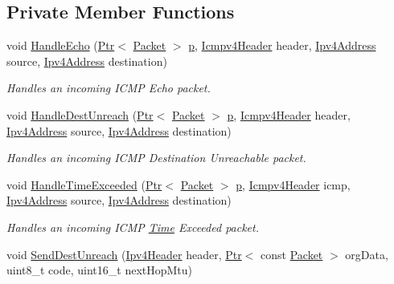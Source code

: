 \subsection*{Private Member Functions}
\begin{DoxyCompactItemize}
\item 
void \hyperlink{classns3_1_1Icmpv4L4Protocol_aaa610991d0cf4c045f1183c2e5042900}{Handle\+Echo} (\hyperlink{classns3_1_1Ptr}{Ptr}$<$ \hyperlink{classns3_1_1Packet}{Packet} $>$ \hyperlink{lte__link__budget__x2__handover__measures_8m_ac9de518908a968428863f829398a4e62}{p}, \hyperlink{classns3_1_1Icmpv4Header}{Icmpv4\+Header} header, \hyperlink{classns3_1_1Ipv4Address}{Ipv4\+Address} source, \hyperlink{classns3_1_1Ipv4Address}{Ipv4\+Address} destination)
\begin{DoxyCompactList}\small\item\em Handles an incoming I\+C\+MP Echo packet. \end{DoxyCompactList}\item 
void \hyperlink{classns3_1_1Icmpv4L4Protocol_aeed200f118290a87d0cb24ac1532f105}{Handle\+Dest\+Unreach} (\hyperlink{classns3_1_1Ptr}{Ptr}$<$ \hyperlink{classns3_1_1Packet}{Packet} $>$ \hyperlink{lte__link__budget__x2__handover__measures_8m_ac9de518908a968428863f829398a4e62}{p}, \hyperlink{classns3_1_1Icmpv4Header}{Icmpv4\+Header} header, \hyperlink{classns3_1_1Ipv4Address}{Ipv4\+Address} source, \hyperlink{classns3_1_1Ipv4Address}{Ipv4\+Address} destination)
\begin{DoxyCompactList}\small\item\em Handles an incoming I\+C\+MP Destination Unreachable packet. \end{DoxyCompactList}\item 
void \hyperlink{classns3_1_1Icmpv4L4Protocol_ad1b58eb883e6072756f79aa4b6f87291}{Handle\+Time\+Exceeded} (\hyperlink{classns3_1_1Ptr}{Ptr}$<$ \hyperlink{classns3_1_1Packet}{Packet} $>$ \hyperlink{lte__link__budget__x2__handover__measures_8m_ac9de518908a968428863f829398a4e62}{p}, \hyperlink{classns3_1_1Icmpv4Header}{Icmpv4\+Header} icmp, \hyperlink{classns3_1_1Ipv4Address}{Ipv4\+Address} source, \hyperlink{classns3_1_1Ipv4Address}{Ipv4\+Address} destination)
\begin{DoxyCompactList}\small\item\em Handles an incoming I\+C\+MP \hyperlink{classns3_1_1Time}{Time} Exceeded packet. \end{DoxyCompactList}\item 
void \hyperlink{classns3_1_1Icmpv4L4Protocol_a529f7a6a9ad8a08638b759488dc8be53}{Send\+Dest\+Unreach} (\hyperlink{classns3_1_1Ipv4Header}{Ipv4\+Header} header, \hyperlink{classns3_1_1Ptr}{Ptr}$<$ const \hyperlink{classns3_1_1Packet}{Packet} $>$ org\+Data, uint8\+\_\+t code, uint16\+\_\+t next\+Hop\+Mtu)

\end{DoxyCompactItemize}
